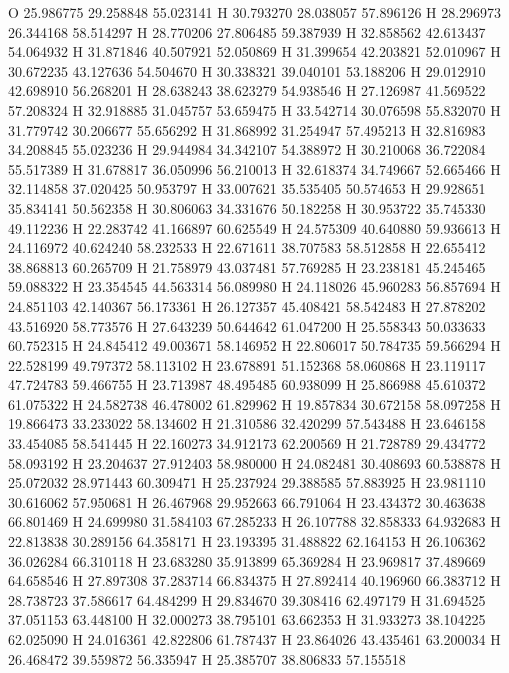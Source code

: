\documentclass{article}
\begin{document}
O 25.986775 29.258848 55.023141 
H 30.793270 28.038057 57.896126 
H 28.296973 26.344168 58.514297 
H 28.770206 27.806485 59.387939 
H 32.858562 42.613437 54.064932 
H 31.871846 40.507921 52.050869 
H 31.399654 42.203821 52.010967 
H 30.672235 43.127636 54.504670 
H 30.338321 39.040101 53.188206 
H 29.012910 42.698910 56.268201 
H 28.638243 38.623279 54.938546 
H 27.126987 41.569522 57.208324 
H 32.918885 31.045757 53.659475 
H 33.542714 30.076598 55.832070 
H 31.779742 30.206677 55.656292 
H 31.868992 31.254947 57.495213 
H 32.816983 34.208845 55.023236 
H 29.944984 34.342107 54.388972 
H 30.210068 36.722084 55.517389 
H 31.678817 36.050996 56.210013 
H 32.618374 34.749667 52.665466 
H 32.114858 37.020425 50.953797 
H 33.007621 35.535405 50.574653 
H 29.928651 35.834141 50.562358 
H 30.806063 34.331676 50.182258 
H 30.953722 35.745330 49.112236 
H 22.283742 41.166897 60.625549 
H 24.575309 40.640880 59.936613 
H 24.116972 40.624240 58.232533 
H 22.671611 38.707583 58.512858 
H 22.655412 38.868813 60.265709 
H 21.758979 43.037481 57.769285 
H 23.238181 45.245465 59.088322 
H 23.354545 44.563314 56.089980 
H 24.118026 45.960283 56.857694 
H 24.851103 42.140367 56.173361 
H 26.127357 45.408421 58.542483 
H 27.878202 43.516920 58.773576 
H 27.643239 50.644642 61.047200 
H 25.558343 50.033633 60.752315 
H 24.845412 49.003671 58.146952 
H 22.806017 50.784735 59.566294 
H 22.528199 49.797372 58.113102 
H 23.678891 51.152368 58.060868 
H 23.119117 47.724783 59.466755 
H 23.713987 48.495485 60.938099 
H 25.866988 45.610372 61.075322 
H 24.582738 46.478002 61.829962 
H 19.857834 30.672158 58.097258 
H 19.866473 33.233022 58.134602 
H 21.310586 32.420299 57.543488 
H 23.646158 33.454085 58.541445 
H 22.160273 34.912173 62.200569 
H 21.728789 29.434772 58.093192 
H 23.204637 27.912403 58.980000 
H 24.082481 30.408693 60.538878 
H 25.072032 28.971443 60.309471 
H 25.237924 29.388585 57.883925 
H 23.981110 30.616062 57.950681 
H 26.467968 29.952663 66.791064 
H 23.434372 30.463638 66.801469 
H 24.699980 31.584103 67.285233 
H 26.107788 32.858333 64.932683 
H 22.813838 30.289156 64.358171 
H 23.193395 31.488822 62.164153 
H 26.106362 36.026284 66.310118 
H 23.683280 35.913899 65.369284 
H 23.969817 37.489669 64.658546 
H 27.897308 37.283714 66.834375 
H 27.892414 40.196960 66.383712 
H 28.738723 37.586617 64.484299 
H 29.834670 39.308416 62.497179 
H 31.694525 37.051153 63.448100 
H 32.000273 38.795101 63.662353 
H 31.933273 38.104225 62.025090 
H 24.016361 42.822806 61.787437 
H 23.864026 43.435461 63.200034 
H 26.468472 39.559872 56.335947 
H 25.385707 38.806833 57.155518 
\end{document}
